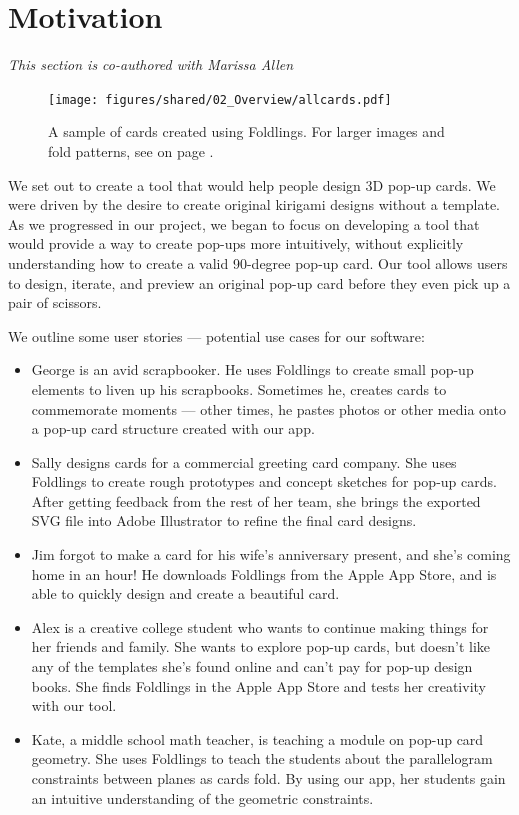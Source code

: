 \section{Motivation}\label{motivation}

\emph{This section is co-authored with Marissa Allen}

\begin{figure}[htbp]
\centering
\texttt{[image: figures/shared/02\_Overview/allcards.pdf]}
\caption{A sample of cards created using Foldlings. For larger images
and fold patterns, see  on page
\pageref{appendix-d-sample-cards}.}
\end{figure}

We set out to create a tool that would help people design 3D pop-up
cards. We were driven by the desire to create original kirigami designs
without a template. As we progressed in our project, we began to focus
on developing a tool that would provide a way to create pop-ups more
intuitively, without explicitly understanding how to create a valid
90-degree pop-up card. Our tool allows users to design, iterate, and
preview an original pop-up card before they even pick up a pair of
scissors.

We outline some user stories --- potential use cases for our software:

\begin{itemize}
\itemsep1pt\parskip0pt
\item
  George is an avid scrapbooker. He uses Foldlings to create small
  pop-up elements to liven up his scrapbooks. Sometimes he, creates
  cards to commemorate moments --- other times, he pastes photos or
  other media onto a pop-up card structure created with our app.
\item
  Sally designs cards for a commercial greeting card company. She uses
  Foldlings to create rough prototypes and concept sketches for pop-up
  cards. After getting feedback from the rest of her team, she brings
  the exported SVG file into Adobe Illustrator to refine the final card
  designs.
\item
  Jim forgot to make a card for his wife's anniversary present, and
  she's coming home in an hour! He downloads Foldlings from the Apple
  App Store, and is able to quickly design and create a beautiful card.
\item
  Alex is a creative college student who wants to continue making things
  for her friends and family. She wants to explore pop-up cards, but
  doesn't like any of the templates she's found online and can't pay for
  pop-up design books. She finds Foldlings in the Apple App Store and
  tests her creativity with our tool.
\item
  Kate, a middle school math teacher, is teaching a module on pop-up
  card geometry. She uses Foldlings to teach the students about the
  parallelogram constraints between planes as cards fold. By using our
  app, her students gain an intuitive understanding of the geometric
  constraints.
\end{itemize}

